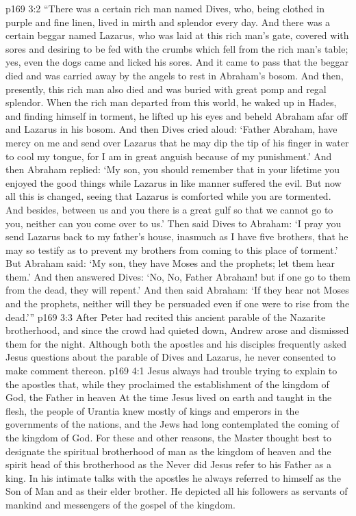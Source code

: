 \vs p169 3:2 “There was a certain rich man named Dives, who, being clothed in purple and fine linen, lived in mirth and splendor every day. And there was a certain beggar named Lazarus, who was laid at this rich man’s gate, covered with sores and desiring to be fed with the crumbs which fell from the rich man’s table; yes, even the dogs came and licked his sores. And it came to pass that the beggar died and was carried away by the angels to rest in Abraham’s bosom. And then, presently, this rich man also died and was buried with great pomp and regal splendor. When the rich man departed from this world, he waked up in Hades, and finding himself in torment, he lifted up his eyes and beheld Abraham afar off and Lazarus in his bosom. And then Dives cried aloud: ‘Father Abraham, have mercy on me and send over Lazarus that he may dip the tip of his finger in water to cool my tongue, for I am in great anguish because of my punishment.’ And then Abraham replied: ‘My son, you should remember that in your lifetime you enjoyed the good things while Lazarus in like manner suffered the evil. But now all this is changed, seeing that Lazarus is comforted while you are tormented. And besides, between us and you there is a great gulf so that we cannot go to you, neither can you come over to us.’ Then said Dives to Abraham: ‘I pray you send Lazarus back to my father’s house, inasmuch as I have five brothers, that he may so testify as to prevent my brothers from coming to this place of torment.’ But Abraham said: ‘My son, they have Moses and the prophets; let them hear them.’ And then answered Dives: ‘No, No, Father Abraham! but if one go to them from the dead, they will repent.’ And then said Abraham: ‘If they hear not Moses and the prophets, neither will they be persuaded even if one were to rise from the dead.’”
\vs p169 3:3 After Peter had recited this ancient parable of the Nazarite brotherhood, and since the crowd had quieted down, Andrew arose and dismissed them for the night. Although both the apostles and his disciples frequently asked Jesus questions about the parable of Dives and Lazarus, he never consented to make comment thereon.\plusone
{}
\vs p169 4:1 Jesus always had trouble trying to explain to the apostles that, while they proclaimed the establishment of the kingdom of God, the Father in heaven  At the time Jesus lived on earth and taught in the flesh, the people of Urantia knew mostly of kings and emperors in the governments of the nations, and the Jews had long contemplated the coming of the kingdom of God. For these and other reasons, the Master thought best to designate the spiritual brotherhood of man as the kingdom of heaven and the spirit head of this brotherhood as the  Never did Jesus refer to his Father as a king. In his intimate talks with the apostles he always referred to himself as the Son of Man and as their elder brother. He depicted all his followers as servants of mankind and messengers of the gospel of the kingdom.
